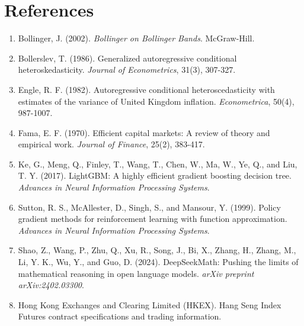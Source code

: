 \documentclass[11pt,a4paper]{article}
\begin{document}
\section*{References}

\begin{enumerate}
    \item Bollinger, J. (2002). \textit{Bollinger on Bollinger Bands}. McGraw-Hill.
    \item Bollerslev, T. (1986). Generalized autoregressive conditional heteroskedasticity. \textit{Journal of Econometrics}, 31(3), 307-327.
    \item Engle, R. F. (1982). Autoregressive conditional heteroscedasticity with estimates of the variance of United Kingdom inflation. \textit{Econometrica}, 50(4), 987-1007.
    \item Fama, E. F. (1970). Efficient capital markets: A review of theory and empirical work. \textit{Journal of Finance}, 25(2), 383-417.
    \item Ke, G., Meng, Q., Finley, T., Wang, T., Chen, W., Ma, W., Ye, Q., and Liu, T. Y. (2017). LightGBM: A highly efficient gradient boosting decision tree. \textit{Advances in Neural Information Processing Systems}.
    \item Sutton, R. S., McAllester, D., Singh, S., and Mansour, Y. (1999). Policy gradient methods for reinforcement learning with function approximation. \textit{Advances in Neural Information Processing Systems}.
    \item Shao, Z., Wang, P., Zhu, Q., Xu, R., Song, J., Bi, X., Zhang, H., Zhang, M., Li, Y. K., Wu, Y., and Guo, D. (2024). DeepSeekMath: Pushing the limits of mathematical reasoning in open language models. \textit{arXiv preprint arXiv:2402.03300}.
    \item Hong Kong Exchanges and Clearing Limited (HKEX). Hang Seng Index Futures contract specifications and trading information.
\end{enumerate}
\end{document}
